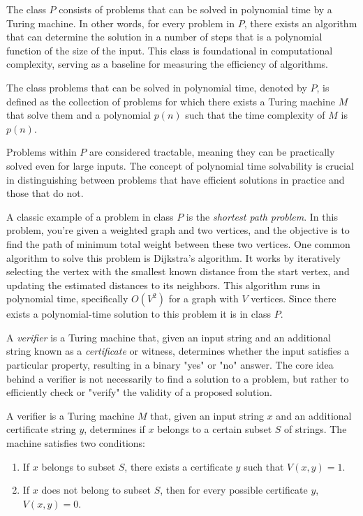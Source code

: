 The class $P$ consists of problems that can be solved in polynomial time by a Turing machine. In other words, for every problem in $P$, there exists an algorithm that can determine the solution in a number of steps that is a polynomial function of the size of the input. This class is foundational in computational complexity, serving as a baseline for measuring the efficiency of algorithms. 

\begin{definition}
The class problems that can be solved in polynomial time, denoted by $P$, is defined as the collection of problems for which there exists a Turing machine $M$ that solve them and a polynomial $p(n)$ such that the time complexity of $M$ is $p(n)$.
\end{definition}

Problems within $P$ are considered tractable, meaning they can be practically solved even for large inputs. The concept of polynomial time solvability is crucial in distinguishing between problems that have efficient solutions in practice and those that do not.

\begin{example}
A classic example of a problem in class $P$ is the \emph{shortest path problem}. In this problem, you're given a weighted graph and two vertices, and the objective is to find the path of minimum total weight between these two vertices. One common algorithm to solve this problem is Dijkstra's algorithm. It works by iteratively selecting the vertex with the smallest known distance from the start vertex, and updating the estimated distances to its neighbors. This algorithm runs in polynomial time, specifically $O(V^2)$ for a graph with $V$ vertices. Since there exists a polynomial-time solution to this problem it is in class $P$.
\end{example}

A \emph{verifier} is a Turing machine that, given an input string and an additional string known as a \emph{certificate} or witness, determines whether the input satisfies a particular property, resulting in a binary "yes" or "no" answer. The core idea behind a verifier is not necessarily to find a solution to a problem, but rather to efficiently check or "verify" the validity of a proposed solution. 

\begin{definition}
A verifier is a Turing machine $M$ that, given an input string $x$ and an additional certificate string $y$, determines if $x$ belongs to a certain subset $S$ of strings. The machine satisfies two conditions:
\begin{enumerate}
    \item If $x$ belongs to subset $S$, there exists a certificate $y$ such that $V(x, y) = 1$.
    \item If $x$ does not belong to subset $S$, then for every possible certificate $y$, $V(x, y) = 0$.
\end{enumerate}
\end{definition}

